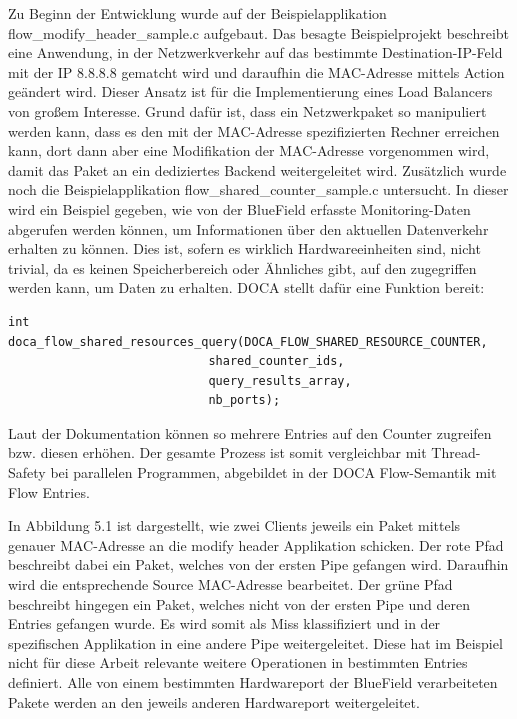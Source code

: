 Zu Beginn der Entwicklung wurde auf der Beispielapplikation flow\_modify\_header\_sample.c aufgebaut. Das besagte Beispielprojekt beschreibt eine Anwendung, in der Netzwerkverkehr auf das bestimmte Destination-IP-Feld mit der IP 8.8.8.8 gematcht wird und daraufhin die MAC-Adresse mittels Action geändert wird. Dieser Ansatz ist für die Implementierung eines Load Balancers von großem Interesse. Grund dafür ist, dass ein Netzwerkpaket so manipuliert werden kann, dass es den mit der MAC-Adresse spezifizierten Rechner erreichen kann, dort dann aber eine Modifikation der MAC-Adresse vorgenommen wird, damit das Paket an ein dediziertes Backend weitergeleitet wird. Zusätzlich wurde noch die Beispielapplikation flow\_shared\_counter\_sample.c untersucht. In dieser wird ein Beispiel gegeben, wie von der BlueField erfasste Monitoring-Daten abgerufen werden können, um Informationen über den aktuellen Datenverkehr erhalten zu können. Dies ist, sofern es wirklich Hardwareeinheiten sind, nicht trivial, da es keinen Speicherbereich oder Ähnliches gibt, auf den zugegriffen werden kann, um Daten zu erhalten. DOCA stellt dafür eine Funktion bereit:
\begin{verbatim}
int doca_flow_shared_resources_query(DOCA_FLOW_SHARED_RESOURCE_COUNTER,
							shared_counter_ids,
							query_results_array,
							nb_ports);
\end{verbatim}
 Laut der Dokumentation können so mehrere Entries auf den Counter zugreifen bzw. diesen erhöhen. Der gesamte Prozess ist somit vergleichbar mit Thread-Safety bei parallelen Programmen, abgebildet in der DOCA Flow-Semantik mit Flow Entries.

In Abbildung 5.1 ist dargestellt, wie zwei Clients jeweils ein Paket mittels genauer MAC-Adresse an die modify header Applikation schicken. Der rote Pfad beschreibt dabei ein Paket, welches von der ersten Pipe gefangen wird. Daraufhin wird die entsprechende Source MAC-Adresse bearbeitet. Der grüne Pfad beschreibt hingegen ein Paket, welches nicht von der ersten Pipe und deren Entries gefangen wurde. Es wird somit als Miss klassifiziert und in der spezifischen Applikation in eine andere Pipe weitergeleitet. Diese hat im Beispiel nicht für diese Arbeit relevante weitere Operationen in bestimmten Entries definiert. Alle von einem bestimmten Hardwareport der BlueField verarbeiteten Pakete werden an den jeweils anderen Hardwareport weitergeleitet.
